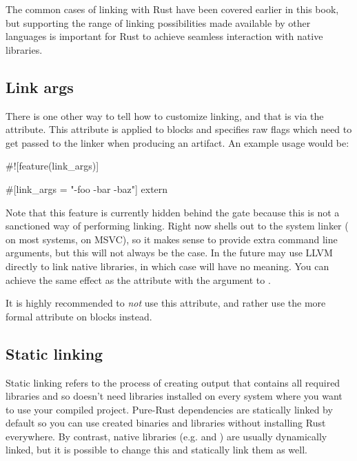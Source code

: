 The common cases of linking with Rust have been covered earlier in this book, but supporting the range of linking 
possibilities made available by other languages is important for Rust to achieve seamless interaction with native 
libraries.

\subsection*{Link args}

There is one other way to tell  how to customize linking, and that is via the  attribute. 
This attribute is applied to  blocks and specifies raw flags which need to get passed to the linker when 
producing an artifact. An example usage would be:

\begin{rustc}
#![feature(link_args)]

#[link_args = "-foo -bar -baz"]
extern {}
\end{rustc}

Note that this feature is currently hidden behind the  gate because this is not a sanctioned way 
of performing linking. Right now  shells out to the system linker ( on most systems,  
on MSVC), so it makes sense to provide extra command line arguments, but this will not always be the case. In the future 
 may use LLVM directly to link native libraries, in which case  will have no meaning. You can 
achieve the same effect as the  attribute with the  argument to .

\blank

It is highly recommended to \emph{not} use this attribute, and rather use the more formal \code{\#[link(...)]} attribute on 
 blocks instead.

\subsection*{Static linking}

Static linking refers to the process of creating output that contains all required libraries and so doesn't need libraries 
installed on every system where you want to use your compiled project. Pure-Rust dependencies are statically linked by default 
so you can use created binaries and libraries without installing Rust everywhere. By contrast, native libraries (e.g.  
and ) are usually dynamically linked, but it is possible to change this and statically link them as well.

